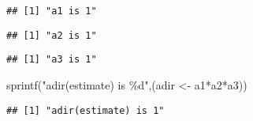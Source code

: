 \documentclass[
]{article}
\newenvironment{Shaded}{\begin{snugshade}}{\end{snugshade}}
\newcommand{\FunctionTok}[1]{\textcolor[rgb]{0.00,0.00,0.00}{#1}}
\newcommand{\NormalTok}[1]{#1}
\newcommand{\OtherTok}[1]{\textcolor[rgb]{0.56,0.35,0.01}{#1}}
\newcommand{\SpecialCharTok}[1]{\textcolor[rgb]{0.00,0.00,0.00}{#1}}
\newcommand{\StringTok}[1]{\textcolor[rgb]{0.31,0.60,0.02}{#1}}
\begin{document}
\begin{Shaded}
\end{Shaded}

\begin{verbatim}
## [1] "a1 is 1"
\end{verbatim}

\begin{Shaded}
\end{Shaded}

\begin{verbatim}
## [1] "a2 is 1"
\end{verbatim}

\begin{Shaded}
\end{Shaded}

\begin{verbatim}
## [1] "a3 is 1"
\end{verbatim}

\begin{Shaded}
\begin{Highlighting}[]
\FunctionTok{sprintf}\NormalTok{(}\StringTok{"adir(estimate) is \%d"}\NormalTok{,(adir }\OtherTok{\textless{}{-}}\NormalTok{ a1}\SpecialCharTok{*}\NormalTok{a2}\SpecialCharTok{*}\NormalTok{a3))}
\end{Highlighting}
\end{Shaded}

\begin{verbatim}
## [1] "adir(estimate) is 1"
\end{verbatim}
\end{document}
